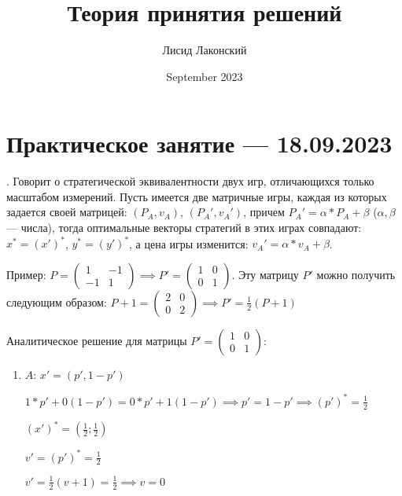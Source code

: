 \documentclass{article}
\title{Теория принятия решений}
\author{Лисид Лаконский}
\date{September 2023}
\begin{document}
\raggedright

\maketitle

\tableofcontents
\pagebreak

\section{Практическое занятие — 18.09.2023}

. Говорит о стратегической эквивалентности двух игр, отличающихся только масштабом измерений. Пусть имеется две матричные игры, каждая из которых задается своей матрицей: $(P_{A}, v_{A})$, $(P_{A}', v_{A}')$, причем $P_{A}' = \alpha * P_{A} + \beta$ ($\alpha, \beta$ — числа), тогда оптимальные векторы стратегий в этих играх совпадают: $x^{*} = (x')^{*}$, $y^{*} = (y')^{*}$, а цена игры изменится: $v_{A}' = \alpha * v_{A} + \beta$.

Пример: $P = \begin{pmatrix}
	1 & -1 \\
	-1 & 1
\end{pmatrix} \implies P' = \begin{pmatrix}
	1 & 0 \\
	0 & 1
\end{pmatrix}$. Эту матрицу $P'$ можно получить следующим образом: $P + 1 = \begin{pmatrix}
	2 & 0 \\
	0 & 2
\end{pmatrix} \implies P' = \frac{1}{2}(P + 1)$

Аналитическое решение для матрицы $P' = \begin{pmatrix}
	1 & 0 \\
	 0 & 1
\end{pmatrix}$:

\begin{enumerate}
	\item $A$: $x' = (p', 1 - p')$

	$1 * p' + 0 (1 - p') = 0 * p' + 1 (1 - p') \implies p' = 1 - p' \implies (p')^{*} = \frac{1}{2}$

	$(x')^{*} = (\frac{1}{2}; \frac{1}{2})$

	$v' = (p')^{*} = \frac{1}{2}$

	$v' = \frac{1}{2}(v + 1) = \frac{1}{2} \implies v = 0$
\end{enumerate}
\end{document}
